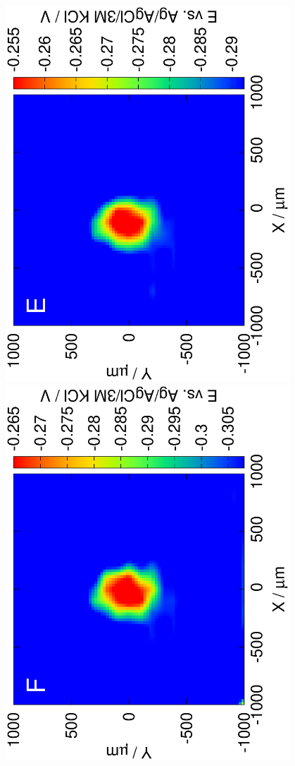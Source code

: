 \documentclass{beamer}
\begin{document}
\begin{frame}
\begin{columns}[T]
\begin{column}{.2\textwidth}
\includegraphics[trim = 10mm 30mm 0mm 10mm, clip, width=0.8\textwidth, angle=-90]{13121313_deconvoluted.eps}\\
\includegraphics[trim = 10mm 30mm 0mm 10mm, clip, width=0.8\textwidth, angle=-90]{13121314_deconvoluted.eps}\\

\end{column}
\end{columns}
\end{frame}
\end{document}
